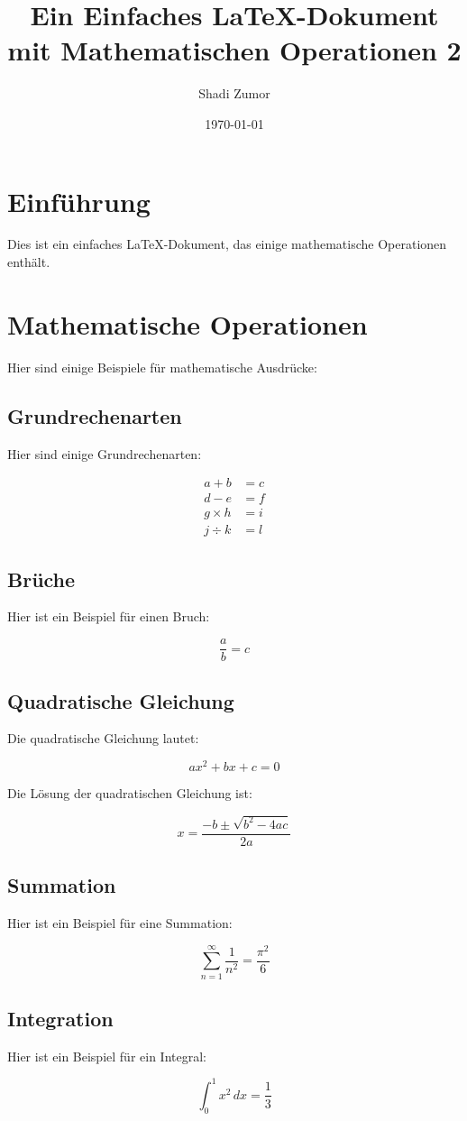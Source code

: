 \documentclass{article}
\begin{document}
\title{Ein Einfaches LaTeX-Dokument mit Mathematischen Operationen 2 }
\author{Shadi Zumor}
\date{\today}
\maketitle

\section{Einführung}
Dies ist ein einfaches LaTeX-Dokument, das einige mathematische Operationen enthält.

\section{Mathematische Operationen}

Hier sind einige Beispiele für mathematische Ausdrücke:

\subsection{Grundrechenarten}
Hier sind einige Grundrechenarten:

\begin{align*}
a + b &= c \\
d - e &= f \\
g \times h &= i \\
j \div k &= l
\end{align*}

\subsection{Brüche}
Hier ist ein Beispiel für einen Bruch:

\begin{equation}
\frac{a}{b} = c
\end{equation}

\subsection{Quadratische Gleichung}
Die quadratische Gleichung lautet:

\begin{equation}
ax^2 + bx + c = 0
\end{equation}

Die Lösung der quadratischen Gleichung ist:

\begin{equation}
x = \frac{-b \pm \sqrt{b^2 - 4ac}}{2a}
\end{equation}

\subsection{Summation}
Hier ist ein Beispiel für eine Summation:

\begin{equation}
\sum_{n=1}^{\infty} \frac{1}{n^2} = \frac{\pi^2}{6}
\end{equation}

\subsection{Integration}
Hier ist ein Beispiel für ein Integral:

\begin{equation}
\int_{0}^{1} x^2 \, dx = \frac{1}{3}
\end{equation}
\end{document}
